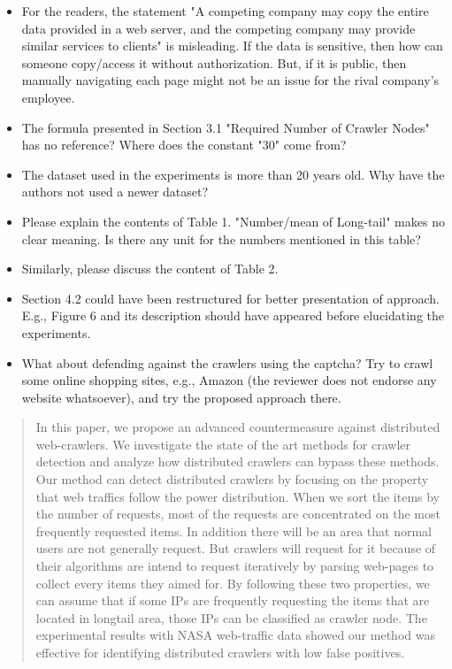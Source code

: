 \documentclass[sigconf,anonymous=true]{acmart}
\begin{document}
\begin{itemize}
\item For the readers, the statement "A competing company may copy the entire data provided in a web server, and the competing company may provide similar services to clients" is misleading. If the data is sensitive, then how can someone copy/access it without authorization. But, if it is public, then manually navigating each page might not be an issue for the rival company's employee.
\item The formula presented in Section 3.1 "Required Number of Crawler Nodes" has no reference? Where does the constant "30" come from?
\item The dataset used in the experiments is more than 20 years old. Why have the authors not used a newer dataset?
\item Please explain the contents of Table 1. "Number/mean of Long-tail" makes no clear meaning. Is there any unit for the numbers mentioned in this table?
\item Similarly, please discuss the content of Table 2.
\item Section 4.2 could have been restructured for better presentation of approach. E.g., Figure 6 and its description should have appeared before elucidating the experiments.
\item What about defending against the crawlers using the captcha? Try to crawl some online shopping sites, e.g., Amazon (the reviewer does not endorse any website whatsoever), and try the proposed approach there.
\end{itemize}


\begin{abstract}
In this paper, we propose an advanced countermeasure against distributed web-crawlers. We investigate the state of the art methods for crawler detection and analyze how distributed crawlers can bypass these methods.  Our method can detect distributed crawlers by focusing on the property that web traffics follow the power distribution. When we sort the items by the number of requests, most of the requests are concentrated on the most frequently requested items. In addition there will be an area that normal users are not generally request. But crawlers will request for it because of their algorithms are intend to request iteratively by parsing web-pages to collect every items they aimed for. By following these two properties, we can assume that if some IPs are frequently requesting the items that are located in longtail area, those IPs can be classified as crawler node. The experimental results with NASA web-traffic data showed our method was effective for identifying distributed crawlers with low false positives.
\end{abstract}
\end{document}
